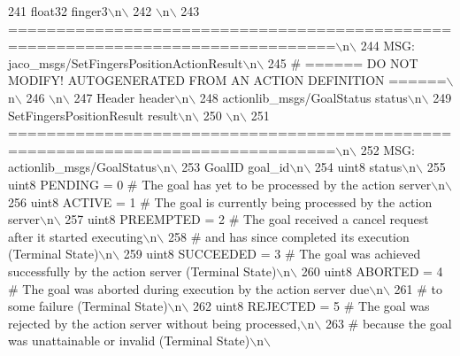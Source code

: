\begin{DoxyCode}
241 \textcolor{stringliteral}{float32 finger3\(\backslash\)n\(\backslash\)}
242 \textcolor{stringliteral}{\(\backslash\)n\(\backslash\)}
243 \textcolor{stringliteral}{================================================================================\(\backslash\)n\(\backslash\)}
244 \textcolor{stringliteral}{MSG: jaco\_msgs/SetFingersPositionActionResult\(\backslash\)n\(\backslash\)}
245 \textcolor{stringliteral}{# ====== DO NOT MODIFY! AUTOGENERATED FROM AN ACTION DEFINITION ======\(\backslash\)n\(\backslash\)}
246 \textcolor{stringliteral}{\(\backslash\)n\(\backslash\)}
247 \textcolor{stringliteral}{Header header\(\backslash\)n\(\backslash\)}
248 \textcolor{stringliteral}{actionlib\_msgs/GoalStatus status\(\backslash\)n\(\backslash\)}
249 \textcolor{stringliteral}{SetFingersPositionResult result\(\backslash\)n\(\backslash\)}
250 \textcolor{stringliteral}{\(\backslash\)n\(\backslash\)}
251 \textcolor{stringliteral}{================================================================================\(\backslash\)n\(\backslash\)}
252 \textcolor{stringliteral}{MSG: actionlib\_msgs/GoalStatus\(\backslash\)n\(\backslash\)}
253 \textcolor{stringliteral}{GoalID goal\_id\(\backslash\)n\(\backslash\)}
254 \textcolor{stringliteral}{uint8 status\(\backslash\)n\(\backslash\)}
255 \textcolor{stringliteral}{uint8 PENDING         = 0   # The goal has yet to be processed by the action server\(\backslash\)n\(\backslash\)}
256 \textcolor{stringliteral}{uint8 ACTIVE          = 1   # The goal is currently being processed by the action server\(\backslash\)n\(\backslash\)}
257 \textcolor{stringliteral}{uint8 PREEMPTED       = 2   # The goal received a cancel request after it started executing\(\backslash\)n\(\backslash\)}
258 \textcolor{stringliteral}{                            #   and has since completed its execution (Terminal State)\(\backslash\)n\(\backslash\)}
259 \textcolor{stringliteral}{uint8 SUCCEEDED       = 3   # The goal was achieved successfully by the action server (Terminal State)\(\backslash\)n\(\backslash\)}
260 \textcolor{stringliteral}{uint8 ABORTED         = 4   # The goal was aborted during execution by the action server due\(\backslash\)n\(\backslash\)}
261 \textcolor{stringliteral}{                            #    to some failure (Terminal State)\(\backslash\)n\(\backslash\)}
262 \textcolor{stringliteral}{uint8 REJECTED        = 5   # The goal was rejected by the action server without being processed,\(\backslash\)n\(\backslash\)}
263 \textcolor{stringliteral}{                            #    because the goal was unattainable or invalid (Terminal State)\(\backslash\)n\(\backslash\)}

\end{DoxyCode}
